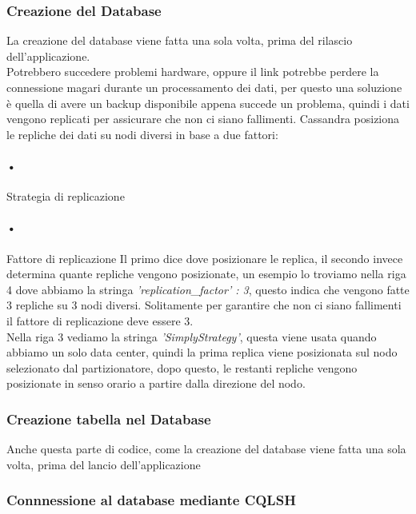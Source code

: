 \subsubsection{Creazione del Database}


La creazione del database viene fatta una sola volta, prima del rilascio dell'applicazione. 
\\Potrebbero succedere problemi hardware, oppure il link potrebbe perdere la connessione magari durante un processamento dei dati, per questo una soluzione è quella di avere un backup disponibile appena succede un problema, quindi i dati vengono replicati per assicurare che non ci siano fallimenti. Cassandra posiziona le repliche dei dati su nodi diversi in base a due fattori:
\paragraph{•} Strategia di replicazione
\paragraph{•} Fattore di replicazione
Il primo dice dove posizionare le replica, il secondo invece determina quante repliche vengono posizionate, un esempio lo troviamo nella riga 4 dove abbiamo la stringa \textit{'replication\_factor' : 3}, questo indica che vengono fatte 3 repliche su 3 nodi diversi. Solitamente per garantire che non ci siano fallimenti il fattore di replicazione deve essere 3.
\\Nella riga 3 vediamo la stringa \textit{'SimplyStrategy'}, questa viene usata quando abbiamo un solo data center, quindi la prima replica viene posizionata sul nodo selezionato dal partizionatore, dopo questo, le restanti repliche vengono posizionate in senso orario a partire dalla direzione del nodo.
\subsubsection{Creazione tabella nel Database}


Anche questa parte di codice, come la creazione del database viene fatta una sola volta, prima del lancio dell'applicazione
\subsubsection{Connnessione al database mediante CQLSH}


